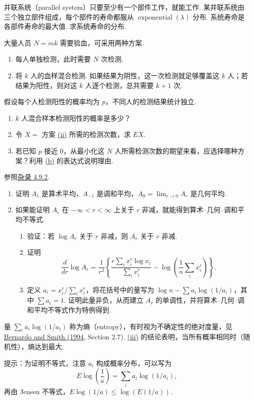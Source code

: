 \begin{exercise}\label{exercise:4.55}
并联系统（parallel system）只要至少有一个部件工作，就能工作. 某并联系统由三个独立部件组成，每个部件的寿命都服从 $\operatorname{exponential}(\lambda)$ 分布. 系统寿命是各部件寿命的最大值. 求系统寿命的分布.
\end{exercise}
\begin{exercise}\label{exercise:4.56}
大量人员 $N=mk$ 需要验血，可采用两种方案.
\begin{enumerate}
\item[(i)] 每人单独检测，此时需要 $N$ 次检测.
\item[(ii)]\label{itm:exercise:4.56:ii} 将 $k$ 人的血样混合检测. 如果结果为阴性，这一次检测就足够覆盖这 $k$ 人；若结果为阳性，则对这 $k$ 人逐个检测，总共需要 $k+1$ 次.
\end{enumerate}
假设每个人检测阳性的概率均为 $p$，不同人的检测结果统计独立.
\begin{enumerate}
\item[(a)] $k$ 人混合样本检测阳性的概率是多少？
\item[(b)]\label{itm:exercise:4.56:b} 令 $X=$ 方案 \hyperref[itm:exercise:4.56:ii]{(ii)} 所需的检测次数，求 $EX$.
\item[(c)] 若已知 $p$ 接近 0，从最小化这 $N$ 人所需检测次数的期望来看，应选择哪种方案？利用 \hyperref[itm:exercise:4.56:b]{(b)} 的表达式说明理由.
\end{enumerate}
\end{exercise}
\begin{exercise}\label{exercise:4.57}
参照\hyperref[misc:4.9.2]{杂录 4.9.2}.
\begin{enumerate}
\item[(a)] 证明 $A_1$ 是算术平均，$A_{-1}$ 是调和平均，$A_0=\lim_{r\to0}A_r$ 是几何平均.
\item[(b)] 如果能证明 $A_r$ 在 $-\infty<r<\infty$ 上关于 $r$ 非减，就能得到算术--几何--调和平均不等式.
\begin{enumerate}
\item[(i)] 验证：若 $\log A_r$ 关于 $r$ 非减，则 $A_r$ 关于 $r$ 非减.
\item[(ii)] 证明
$$\frac d{dr}\log A_r=\frac1{r^2}\left\{\frac{r\sum_i x_i^r\log x_i}{\sum_i x_i^r}-\log\left(\frac1n\sum_i x_i^r\right)\right\}.$$
\item[(iii)]\label{itm:exercise:4.57:b:iii} 定义 $a_i=x_i^r/\sum_i x_i^r$，将花括号中的量写为 $\log n-\sum a_i\log(1/a_i)$，其中 $\sum a_i=1$. 证明此量非负，从而建立 $A_r$ 的单调性，并将算术--几何--调和平均不等式作为特例得到.
\end{enumerate}
\end{enumerate}
量 $\sum_i a_i\log(1/a_i)$ 称为熵（entropy），有时视为不确定性的绝对度量，见 \hyperref[bib:source29]{Bernardo and Smith (1994}, Section 2.7). \hyperref[itm:exercise:4.57:b:iii]{(iii)} 的结论表明，当所有概率相同时（随机性），熵达到最大.

提示：为证明不等式，注意 $a_i$ 构成概率分布，可以写为
$$E\log\left(\frac1a\right)=\sum_i a_i\log(1/a_i),$$
再由 Jensen 不等式，$E\log(1/a)\le\log(E(1/a))$.
\end{exercise}
